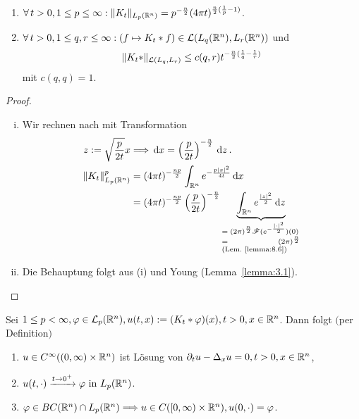 \begin{lemma}
\label{lemma:10.1}
\begin{enumerate}[\rm(i)]
\item $\forall \, t > 0, 1\leq p \leq \infty: \lVert K_t\rVert_{L_p(\mathbb{R}^n)} = p^{-\frac n2} (4\pi t)^{\frac n2 (\frac 1p -1)}$.
\item $\forall \, t > 0, 1 \leq q,r\leq \infty: (f \mapsto K_t \ast f) \in \mathcal L(L_q(\mathbb{R}^n), L_r(\mathbb{R}^n))$ und 
\[
	\lVert K_t \ast \rVert_{\mathcal L(L_q,L_r)} \leq c(q,r) t^{-\frac n2 (\frac 1q-\frac 1r)}
\]
mit $c(q,q) = 1$.
\end{enumerate}
\end{lemma}

\begin{proof}
\begin{enumerate}[(i)]
\item Wir rechnen nach mit Transformation
\begin{align*}
	z := \sqrt{\frac{p}{2t}}x & \Ra \d x = \left( \frac p{2t}\right)^{-\frac n2} \d z\, . \\
	\norm{K_t}_{L_p(\R^n)}^p & = (4\pi t)^{-\frac{np}2} \int_{\R^n} e^{-\frac{p\abs{x}^2}{4t}} \d x \\
	& = (4\pi t)^{-\frac{np}2} \left(\frac p{2t}\right)^{-\frac n2} \underbrace{\int_{\R^n} e^{\frac{\abs z^2}2} \d z}_{\parbox{2.8cm}{\scriptsize $= (2\pi)^{\frac n2} \F(e^{-\frac{\abs\cdot^2}2} )(0)$ \\ $= (2\pi)^{\frac n2}$ (Lem.~\ref{lemma:8.6})}}
\end{align*}
\item Die Behauptung folgt aus (i) und Young (Lemma~\ref{lemma:3.1}).\qedhere
\end{enumerate}
\end{proof}

\begin{theorem}
\label{theorem:10.2}
Sei $1\leq p < \infty, \varphi \in \mathcal{L}_p(\mathbb{R}^n),  u(t,x) := (K_t\ast \varphi)(x), t > 0, x \in \mathbb{R}^n$. Dann folgt $($per Definition$)$
\begin{enumerate}[\rm(i)]
	\item $u \in C^\infty((0,\infty)\times\mathbb{R}^n)$ ist Lösung von $\partial_t u - \Delta_x u = 0 ,  t > 0, x \in \mathbb{R}^n$,
	 \item $ u(t,\cdot) \xrightarrow{t\rightarrow 0^+} \varphi \text{ in } L_p(\mathbb{R}^n)$.
	 \item$ \varphi \in BC(\mathbb{R}^n) \cap L_p(\mathbb{R}^n) \Longrightarrow u \in C([0,\infty)\times \mathbb{R}^n),  u(0,\cdot) = \varphi$.
\end{enumerate}
\end{theorem}

